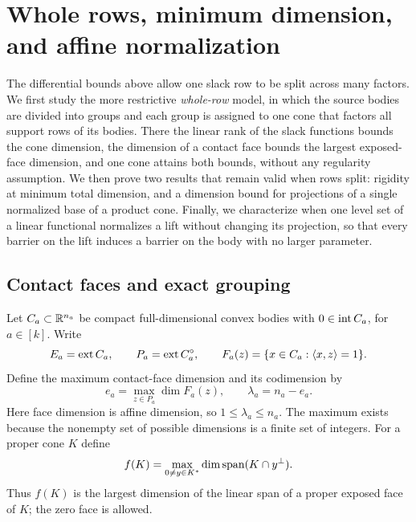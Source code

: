 \section{Whole rows, minimum dimension, and affine normalization}
\label{sec:whole-rows}
The differential bounds above allow one slack row to be split across
many factors. We first study the more restrictive \emph{whole-row}
model, in which the source bodies are divided into groups and each group
is assigned to one cone that factors all support rows of its bodies.
There the linear rank of the slack functions bounds the cone dimension,
the dimension of a contact face bounds the largest exposed-face
dimension, and one cone attains both bounds, without any regularity
assumption. We then prove two results that remain valid when rows split:
rigidity at minimum total dimension, and a dimension bound for
projections of a single normalized base of a product cone. Finally, we
characterize when one level set of a linear functional normalizes a lift
without changing its projection, so that every barrier on the lift
induces a barrier on the body with no larger parameter.

\subsection{Contact faces and exact grouping}
Let $C_a\subset\mathbb R^{n_a}$ be compact full-dimensional convex bodies with
$0\in\operatorname{int} C_a$, for $a\in[k]$. Write
\[
 E_a=\operatorname{ext}C_a,\qquad P_a=\operatorname{ext}C_a^\circ,
 \qquad F_a(z)=\{x\in C_a:\langle x,z\rangle=1\}.
\]
Define the maximum contact-face dimension and its codimension by
\[
 e_a=\max_{z\in P_a}\dim F_a(z),\qquad \lambda_a=n_a-e_a.
\]
Here face dimension is affine dimension, so $1\leq\lambda_a\leq n_a$.
The maximum exists because the nonempty set of possible dimensions is
a finite set of integers. For a proper cone $K$ define
\[
 f(K)=\max_{0\ne y\in K^*}\dim\operatorname{span}(K\cap y^\perp).
\]
Thus $f(K)$ is the largest dimension of the linear span of a proper
exposed face of $K$; the zero face is allowed.

